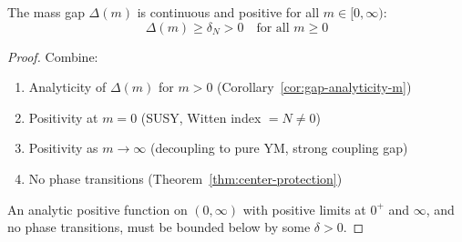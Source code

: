 \begin{corollary}
\label{cor:gap-continuity}
The mass gap $\Delta(m)$ is continuous and positive for all $m \in [0, \infty)$:
\[
\Delta(m) \geq \delta_N > 0 \quad \text{for all } m \geq 0
\]
\end{corollary}

\begin{proof}
Combine:
\begin{enumerate}
\item Analyticity of $\Delta(m)$ for $m > 0$ (Corollary~\ref{cor:gap-analyticity-m})
\item Positivity at $m = 0$ (SUSY, Witten index $= N \neq 0$)
\item Positivity as $m \to \infty$ (decoupling to pure YM, strong coupling gap)
\item No phase transitions (Theorem~\ref{thm:center-protection})
\end{enumerate}

An analytic positive function on $(0,\infty)$ with positive limits at $0^+$ and 
$\infty$, and no phase transitions, must be bounded below by some $\delta > 0$.
\end{proof}






